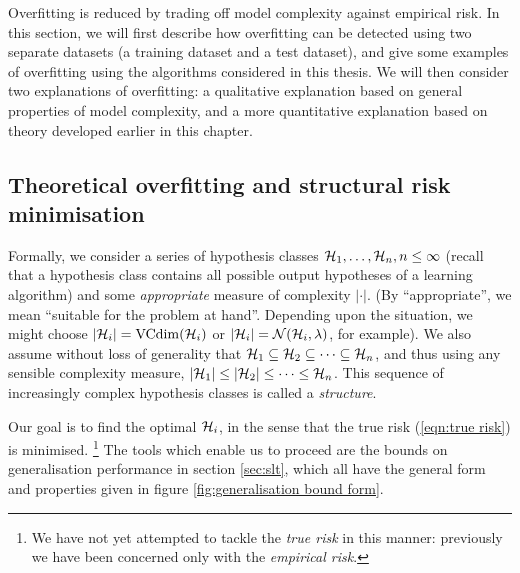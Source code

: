Overfitting is reduced by trading off model complexity against
empirical risk.  In this section, we will first describe how 
overfitting can be detected using two separate datasets (a training
dataset and a test dataset), and give some examples of overfitting
using the algorithms considered in this thesis.  We will then consider
two explanations of overfitting: a qualitative explanation based on
general properties of model complexity, and a more quantitative
explanation based on theory developed earlier in this chapter.


\subsection{Theoretical overfitting and structural risk minimisation}
\label{sec:theoretical overfitting}
\label{acr:srm}

Formally, we consider a series of hypothesis classes $\mathcal{H}_1, \ldots,
\mathcal{H}_n, n \leq \infty$ (recall that a hypothesis class contains all
possible output hypotheses of a learning algorithm) and some
\emph{appropriate} measure of complexity  $|\cdot|$.  (By
``appropriate'', we mean ``suitable for the problem at
hand''. Depending upon the situation, we might choose $|\mathcal{H}_i| =
\mathrm{VCdim}(\mathcal{H}_i)$ or $|\mathcal{H}_i| = \mathcal{N}({\mathcal{H}_i}, {\lambda})$, for
example).  We also assume without loss of generality that $\mathcal{H}_1
\subseteq \mathcal{H}_2 \subseteq \cdots \subseteq \mathcal{H}_n$, and thus using
any sensible complexity measure, $|\mathcal{H}_1| \leq |\mathcal{H}_2| \leq \cdots
\leq \mathcal{H}_n$.  This sequence of increasingly complex hypothesis
classes is called a \emph{structure}.

Our goal is to find the optimal $\mathcal{H}_i$, in the sense that the
true risk (\ref{eqn:true risk}) is minimised.
\footnote{We have not yet attempted to tackle the \emph{true risk} in
this manner: previously we have been concerned only with the
\emph{empirical risk}.}
The tools which enable us to proceed are the bounds on generalisation
performance in section \ref{sec:slt}, which all have the general form
and properties given in figure \ref{fig:generalisation bound form}.

